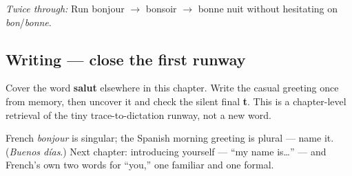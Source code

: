 \emph{Twice through:} Run bonjour $\to$ bonsoir $\to$ bonne nuit without hesitating on \emph{bon}/\emph{bonne}.

\subsection*{Writing — close the first runway}
Cover the word \textbf{salut} elsewhere in this chapter. Write the casual greeting once from memory, then uncover it and check the silent final \textbf{t}. This is a chapter-level retrieval of the tiny trace-to-dictation runway, not a new word.

\begin{tcolorbox}[breakable,colback=teal!4,colframe=teal!35!black,title={Before you move on}]
French \emph{bonjour} is singular; the Spanish morning greeting is plural — name it. (\emph{Buenos días}.) Next chapter: introducing yourself — \textquotedblleft{}my name is…\textquotedblright{} — and French's own two words for \textquotedblleft{}you,\textquotedblright{} one familiar and one formal.
\end{tcolorbox}
